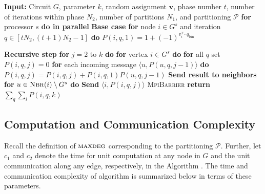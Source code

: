\begin{algorithm}{}
\small
\caption{}
\label{alg:parEvaluate} 
\begin{algorithmic}[1]
\STATE \textbf{Input:} Circuit $G$, parameter $k$, random assignment $\mathbf{v}$, phase number $t$, number of iterations within phase $N_2$, number of partitions $N_1$, and partitioning $\mathcal{P}$
\STATE
\STATE \textbf{for} processor $s$ \textbf{do in parallel}
\STATE \quad \textbf{Base case}
\STATE \quad \textbf{for} node $i \in G^s$ and iteration $q \in [tN_2,(t+1)N_2-1]$ \textbf{do}
\STATE \qquad $ P(i, q, 1) = 1 + (-1)^{v_i^T \cdot q_{\text{bin}}}$

\STATE \quad \textbf{Recursive step}
\STATE \quad \textbf{for} $j=2$ to $k$ \textbf{do}
\STATE \qquad \textbf{for} vertex $i \in G^s$ \textbf{do}
\STATE \qquad \quad \textbf{for} all $q$ set $P(i,q,  j) = 0$
\STATE \qquad \quad \textbf{for} each incoming message $\langle u, P(u, q, j-1)\rangle$ \textbf{do}
\STATE \qquad \qquad $P(i, q, j)= P(i, q, j) + P(i, q, 1)  P(u, q, j-1)$
\STATE \qquad \quad  \textbf{Send result to neighbors}
\STATE \qquad \quad \textbf{for} $u \in \textsc{Nbr}(i)\setminus G^s$ \textbf{do}
\STATE \qquad \qquad \textbf{Send} $\langle i, P(i, q, j)\rangle$
\STATE \textsc{MpiBarrier}
\STATE \textbf{return} $\sum_q \sum_i P(i, q, k)$
\end{algorithmic}
\end{algorithm}


\subsection{Computation and Communication Complexity}
Recall the definition of $\textsc{maxdeg}{}$ corresponding to the partitioning $\mathcal{P}$.
Further, let $c_1$ and $c_2$ denote the time for unit computation at any node in $G$
and the unit communication along any edge, respectively, in the Algorithm \parcircuitpath{}.
The time and communication complexity of algorithm \parmaxwt{} is summarized below
in terms of these parameters. 


